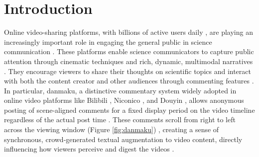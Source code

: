 \section{Introduction}

Online video-sharing platforms, with billions of active users daily \cite{cisco2018cisco}, are playing an increasingly important role in engaging the general public in science communication \cite{morcillo2015typologies,welbourne2016science,xia2022millions}. 
These platforms enable science communicators to capture public attention through cinematic techniques and rich, dynamic, multimodal narratives \cite{zhang2023understanding,huang2020good,morcillo2015typologies}. They encourage viewers to share their thoughts on scientific topics and interact with both the content creator and other audiences through commenting features \cite{zhang2023understanding}.
In particular, danmaku, a distinctive
commentary system widely adopted in online video platforms like Bilibili \cite{bilibili}, Niconico \cite{niconico}, and Douyin \cite{douyin}
, allows anonymous posting \cite{wu2019danmaku} of scene-aligned comments for a fixed display period on the video timeline regardless of the actual post time \cite{ma2017video}. 
These comments scroll from right to left across the viewing window (Figure \ref{fig:danmaku}) 
\cite{yao2017understanding,he2021beyond,wu2019danmaku,ma2017video}, creating a sense of synchronous, crowd-generated 
textual augmentation to video content, directly influencing how viewers perceive and digest the videos  \cite{he2021beyond}.

